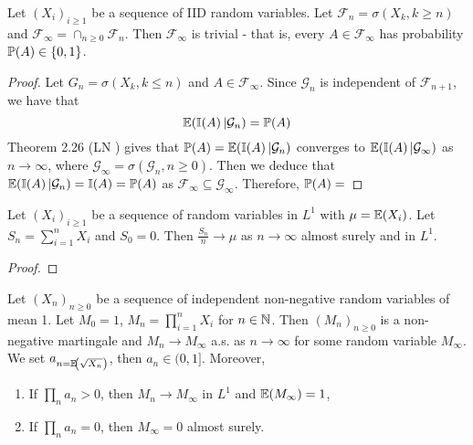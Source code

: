 \begin{thm}
  \label{defn:discrete_time_martingales:17}
  Let $(X_{i})_{i \geq 1}$ be a sequence of IID random variables.  Let
  $\mathcal{F}_{n} = \sigma(X_{k}, k \geq n)$ and
  $\mathcal{F}_{\infty} = \cap_{n \geq 0} \mathcal{F}_{n}$.  Then
  $\mathcal{F}_{\infty}$ is trivial - that is, every $A \in
  \mathcal{F}_{\infty}$ has probability $\Prob{A} \in \{ 0, 1 \}$.
\end{thm}

\begin{proof}
  Let $G_{n} = \sigma(X_{k}, k \leq n)$ and $A \in
  \mathcal{F}_{\infty}$.  Since $\mathcal{G}_{n}$ is independent of
  $\mathcal{F}_{n+1}$, we have that
  \begin{equation}
    \label{eq:47}
    \E{\I{A} | \mathcal{G}_{n}} = \Prob{A}
  \end{equation}
  Theorem 2.26 (LN ) gives that
  $\Prob{A} = \E{\I{A} | \mathcal{G}_{n}}$ converges to $\E{\I{A} |
    \mathcal{G}_{\infty}}$ as $n \rightarrow \infty$, where
  $\mathcal{G}_{\infty} = \sigma(\mathcal{G}_{n}, n \geq 0)$.  Then we
  deduce that $\E{\I{A} | \mathcal{G}_{n}} = \I{A} = \Prob{A}$ as
  $\mathcal{F}_{\infty} \subseteq \mathcal{G}_{\infty}$.  Therefore,
  $\Prob{A} = $
\end{proof}

\begin{thm}
  \label{defn:discrete_time_martingales:18}
  Let $(X_{i})_{i \geq 1}$ be a sequence of \iid random variables in
  $L^{1}$ with $\mu = \E{X_{i}}$.  Let $S_{n} = \sum_{i=1}^{n} X_{i}$
  and $S_{0} = 0$. Then $\frac{S_{n}}{n} \rightarrow \mu$ as $n
  \rightarrow \infty$ almost surely and in $L^{1}$.
\end{thm}

\begin{proof}
\end{proof}

\begin{thm}
  \label{defn:discrete_time_martingales:19}
  Let $(X_{n})_{n \geq 0}$ be a sequence of independent non-negative
  random variables of mean 1.  Let $M_{0} = 1$, $M_{n} =
  \prod_{i=1}^{n} X_{i}$ for $n \in \mathbb{N}$.  Then $(M_{n})_{n \geq 0}$ is
  a non-negative martingale and $M_{n} \rightarrow M_{\infty}$ a.s.
  as $n \rightarrow \infty$ for some random variable $M_{\infty}$.  We
  set $a_{n = \E{\sqrt{X_{n}}}}$, then $a_{n}\in (0, 1]$.  Moreover,
  \begin{enumerate}
  \item If $\prod_{n} a_{n} > 0$, then $M_{n} \rightarrow M_{\infty}$
    in $L^{1}$ and $\E{M_{\infty}} = 1$,
  \item If $\prod_{n} a_{n} = 0$, then $M_{\infty} = 0$ almost surely.
  \end{enumerate}
\end{thm}

